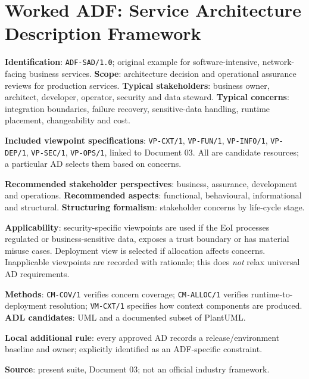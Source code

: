 \documentclass[11pt,letterpaper]{article}
\begin{document}
\section{Worked ADF: Service Architecture Description Framework}
\begin{Worked}
\textbf{Identification}: \texttt{ADF-SAD/1.0}; original example for software-intensive, network-facing business services. \textbf{Scope}: architecture decision and operational assurance reviews for production services. \textbf{Typical stakeholders}: business owner, architect, developer, operator, security and data steward. \textbf{Typical concerns}: integration boundaries, failure recovery, sensitive-data handling, runtime placement, changeability and cost.\par
\textbf{Included viewpoint specifications}: \texttt{VP-CXT/1}, \texttt{VP-FUN/1}, \texttt{VP-INFO/1}, \texttt{VP-DEP/1}, \texttt{VP-SEC/1}, \texttt{VP-OPS/1}, linked to Document 03. All are candidate resources; a particular AD selects them based on concerns.\par
\textbf{Recommended stakeholder perspectives}: business, assurance, development and operations. \textbf{Recommended aspects}: functional, behavioural, informational and structural. \textbf{Structuring formalism}: stakeholder concerns by life-cycle stage.\par
\textbf{Applicability}: security-specific viewpoints are used if the EoI processes regulated or business-sensitive data, exposes a trust boundary or has material misuse cases. Deployment view is selected if allocation affects concerns. Inapplicable viewpoints are recorded with rationale; this does \emph{not} relax universal AD requirements.\par
\textbf{Methods}: \texttt{CM-COV/1} verifies concern coverage; \texttt{CM-ALLOC/1} verifies runtime-to-deployment resolution; \texttt{VM-CXT/1} specifies how context components are produced. \textbf{ADL candidates}: UML and a documented subset of PlantUML.\par
\textbf{Local additional rule}: every approved AD records a release/environment baseline and owner; explicitly identified as an ADF-specific constraint.\par
\textbf{Source}: present suite, Document 03; not an official industry framework.
\end{Worked}
\end{document}
